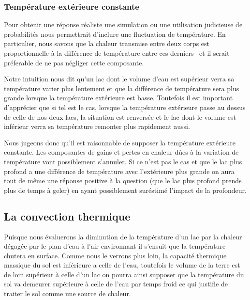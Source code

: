 \documentclass[12pt]{article}
\begin{document}
\subsubsection{Temp\'erature ext\'erieure constante}\label{TempExt}

Pour obtenir une r\'eponse r\'ealiste une simulation ou une utilisation judicieuse de probabilit\'es
nous permettrait d'inclure une fluctuation de temp\'erature. En particulier, nous savons que la
chaleur transmise entre deux corps est proportionnelle \`a la diff\'erence de temp\'erature entre
ces derniers~\cite{Fourier} et il serait pr\'eferable de ne pas n\'egliger cette composante.

Notre intuition nous dit qu'un lac dont le volume d'eau est sup\'erieur verra sa temp\'erature
varier plus lentement et que la diff\'erence de temp\'erature sera plus grande lorsque la
temp\'erature ext\'erieure est basse. Toutefois il est important d'appr\'ecier que si tel est le
cas, lorsque la temp\'erature ext\'erieure passe au dessus de celle de nos deux lacs, la situation
est renvers\'ee et le lac dont le volume est inf\'erieur verra sa temp\'erature remonter plus
rapidement aussi.

Nous jugeons donc qu'il est raisonnable de supposer la temp\'erature ext\'erieure constante. Les
composantes de gains et pertes en chaleur d\^ues \`a la variation de temp\'erature vont possiblement
s'annuler. Si ce n'est pas le cas et que le lac plus profond a une diff\'erence de temp\'erature
avec l'ext\'erieure plus grande on aura tout de m\^eme une r\'eponse positive \`a la question (que
le lac plus profond prends plus de temps \`a geler) en ayant possiblement sur\'estim\'e l'impact de
la profondeur.

\subsection{La convection thermique}\label{Convec}

Puisque nous \'evaluerons la diminution de la temp\'erature d'un lac par la chaleur d\'egag\'ee par le
plan d'eau \`a l'air environnant il s'ensuit que la temp\'erature chutera en surface. Comme nous le
verrons plus loin, la capacit\'e thermique~\cite{CapTherm} massique du sol est inf\'erieure a celle
de l'eau, toutefois le volume de la terre est de loin sup\'erieur \`a celle d'un lac on pourra ainsi
supposer que la temp\'erature du sol va demeurer sup\'erieure \`a celle de l'eau par temps froid ce
qui justifie de traiter le sol comme une source de chaleur.
\end{document}
